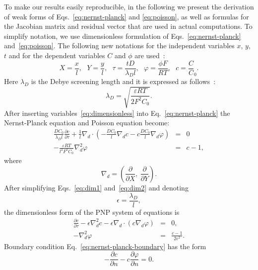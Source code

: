 To make our results easily reproducible, in the following we present the derivation 
of weak forms of Eqs.~\eqref{eq:nernst-planck} and 
\eqref{eq:poisson}, as well as formulas for the Jacobian matrix and residual 
vector that are used in actual computations.
To simplify notation, we use dimensionless formulation of Eqs.~\eqref{eq:nernst-planck}
and~\eqref{eq:poisson}. The following new notations for the independent variables
$x$, $y$, $t$ and for the dependent variables $C$ and $\phi$ are used~\cite{bazant2004diffuse}:
\begin{equation}
  X=\frac xl,\ \ \
  Y=\frac yl,\ \ \
  \tau=\frac{tD}{\lambda_D l},\ \ \
  \varphi=\frac{\phi F}{RT},\ \ \
  c=\frac C C_0.\label{eq:dimensionless}
\end{equation}
Here $\lambda_D$ is the Debye screening length and it is expressed as follows~\cite{bazant2004diffuse}:
\begin{equation}
  \lambda_D=\sqrt{\frac{\varepsilon R T}{2 F^2 C_0}}.\label{eq:debye}
\end{equation}
After inserting variables~\eqref{eq:dimensionless} into Eq.~\eqref{eq:nernst-planck} the Nernst-Planck
equation and Poisson equation become:
\begin{eqnarray}
  \frac{DC_0}{\lambda_D l}\frac{\partial c}{\partial \tau} + \frac 1l  \nabla_d\cdot
    \left(-\frac{DC_0}{l}\nabla_dc-c\frac{DC_0}{l}\nabla_d\varphi\right) &=& 0\label{eq:dim1}\\
  - \frac{\varepsilon R T}{l^2F^2C_0}\nabla_d^2\varphi&=&c-1\label{eq:dim2},
\end{eqnarray}
where
\begin{equation}
  \nabla_d=\left(\frac{\partial}{\partial X},\ \frac{\partial}{\partial Y}\right).
\end{equation}
After simplifying Eqs.~\eqref{eq:dim1} and~\eqref{eq:dim2} and denoting
\begin{equation}
  \epsilon=\frac{\lambda_D}{l},
\end{equation}
the dimensionless form of the PNP system of equations is
\begin{eqnarray}
  \frac{\partial c}{\partial \tau}
    -\epsilon\nabla_d^2 c - \epsilon \nabla_d \cdot \left( c\nabla_d \varphi\right)  &=&0,\label{eq:dimensionless-nernst-planck}\\
  -\nabla_d^2\varphi&=&\frac{c-1}{2\epsilon^2}\label{eq:dimensionless-poisson}.
\end{eqnarray}
Boundary condition Eq.~\eqref{eq:nernst-planck-boundary} has the form
\begin{equation}
  -\frac{\partial c}{\partial n}-c\frac{\partial\varphi}{\partial n}=0.
  \label{eq:dimensionless-nernst-planck-boundary}
\end{equation}
